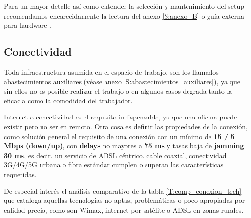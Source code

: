 Para un mayor detalle así como entender la selección y mantenimiento del setup recomendamos encarecidamente la lectura del anexo \ref{S:anexo_B} o guía externa  para hardware \cite{c_guia_hardware}.

\subsection{Conectividad}
Toda infraestructura asumida en el espacio de trabajo, son los llamados abastecimientos auxiliares (véase anexo \ref{S:abastecimientos_auxiliares}), ya que sin ellos no es posible realizar el trabajo o en algunos casos degrada tanto la eficacia como la comodidad del trabajador.

Internet o conectividad es el requisito indispensable, ya que una oficina puede existir pero no ser en remoto. Otra cosa es definir las propiedades de la conexión, como solución general el requisito de una conexión con un mínimo de \textbf{15 / 5 Mbps (down/up)}, con \textbf{delays} no mayores a \textbf{75 ms} y tasas baja de \textbf{jamming 30 ms}, es decir, un servicio de ADSL céntrico, cable coaxial, conectividad 3G/4G/5G urbana o fibra estándar cumplen o superan las características requeridas.

 De especial interés el análisis comparativo de la tabla \ref{T:comp_conexion_tech} que cataloga aquellas tecnologías no aptas, problemáticas o poco apropiadas por calidad precio, como son Wimax, internet por satélite o ADSL en zonas rurales.

